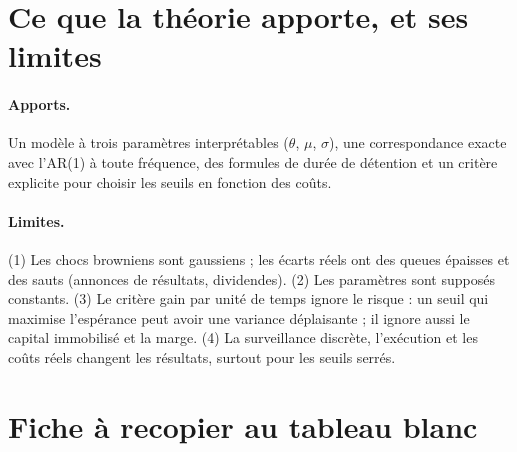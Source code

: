\section{Ce que la théorie apporte, et ses limites}

\paragraph{Apports.} Un modèle à trois paramètres interprétables ($\theta$, $\mu$, $\sigma$), une correspondance exacte avec l'AR(1) à toute fréquence, des formules de durée de détention et un critère explicite pour choisir les seuils en fonction des coûts.

\paragraph{Limites.} (1) Les chocs browniens sont gaussiens ; les écarts réels ont des queues épaisses et des sauts (annonces de résultats, dividendes). (2) Les paramètres sont supposés constants. (3) Le critère \og gain par unité de temps\fg{} ignore le risque : un seuil qui maximise l'espérance peut avoir une variance déplaisante ; il ignore aussi le capital immobilisé et la marge. (4) La surveillance discrète, l'exécution et les coûts réels changent les résultats, surtout pour les seuils serrés.

\section{Fiche à recopier au tableau blanc}

